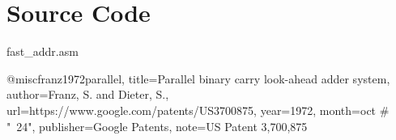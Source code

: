 \documentclass[journal]{IEEEtran}
\begin{document}
\section{Source Code}\label{sec:code}


{fast_addr.asm}

\begin{thebibliography}{99}

	@misc{franz1972parallel,
	  title={Parallel binary carry look-ahead adder system},
	  author={Franz, S. and Dieter, S.},
	  url={https://www.google.com/patents/US3700875},
	  year={1972},
	  month=oct # "~24",
	  publisher={Google Patents},
	  note={US Patent 3,700,875}
	}


\end{thebibliography}
\end{document}
